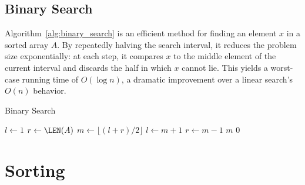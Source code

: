 \subsection{Binary Search}
\label{subsec:binary_search}



Algorithm~\ref{alg:binary_search} is an efficient method for finding an element \(x\) in a sorted array \(A\). 
By repeatedly halving the search interval, it reduces the problem size exponentially: at each step, it compares \(x\) to the middle element of the current interval and discards the half in which \(x\) cannot lie. 
This yields a worst-case running time of \(O(\log n)\), a dramatic improvement over a linear search's \(O(n)\) behavior.


\begin{algorithm}[htb]
    \caption{Binary Search}
    \label{alg:binary_search}
    \begin{algorithmic}[1]
            \State $l \gets 1$ 
            \State $r \gets \LEN(A)$ 
                \State $m \gets \lfloor (l + r) / 2 \rfloor$ 
                    \State $l \gets m + 1$ 
                    \State $r \gets m - 1$ 
                \Else
                    \State \Return $m$ 
                \EndIf
            \EndWhile
            \State \Return $0$ 
        \EndFunction
    \end{algorithmic}
\end{algorithm}

\section{Sorting}

